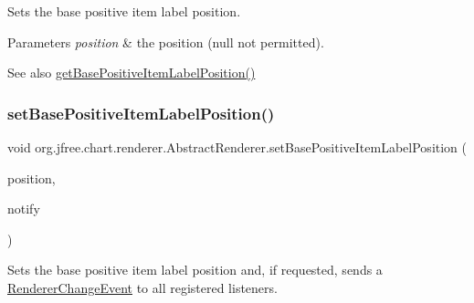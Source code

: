 Sets the base positive item label position.


\begin{DoxyParams}{Parameters}
{\em position} & the position ({\ttfamily null} not permitted).\\
\hline
\end{DoxyParams}
\begin{DoxySeeAlso}{See also}
\mbox{\hyperlink{classorg_1_1jfree_1_1chart_1_1renderer_1_1_abstract_renderer_ab6f209ffdfae7e859ba7c047f3160630}{get\+Base\+Positive\+Item\+Label\+Position()}} 
\end{DoxySeeAlso}
\mbox{\label{classorg_1_1jfree_1_1chart_1_1renderer_1_1_abstract_renderer_a3a6a1583114dd9d464459509d0fde01b}} 
\subsubsection{\texorpdfstring{set\+Base\+Positive\+Item\+Label\+Position()}{setBasePositiveItemLabelPosition()}\hspace{0.1cm}{\footnotesize\ttfamily [2/2]}}
{\footnotesize\ttfamily void org.\+jfree.\+chart.\+renderer.\+Abstract\+Renderer.\+set\+Base\+Positive\+Item\+Label\+Position (\begin{DoxyParamCaption}\item[{\mbox{\hyperlink{classorg_1_1jfree_1_1chart_1_1labels_1_1_item_label_position}{Item\+Label\+Position}}}]{position,  }\item[{boolean}]{notify }\end{DoxyParamCaption})}

Sets the base positive item label position and, if requested, sends a \mbox{\hyperlink{}{Renderer\+Change\+Event}} to all registered listeners.



